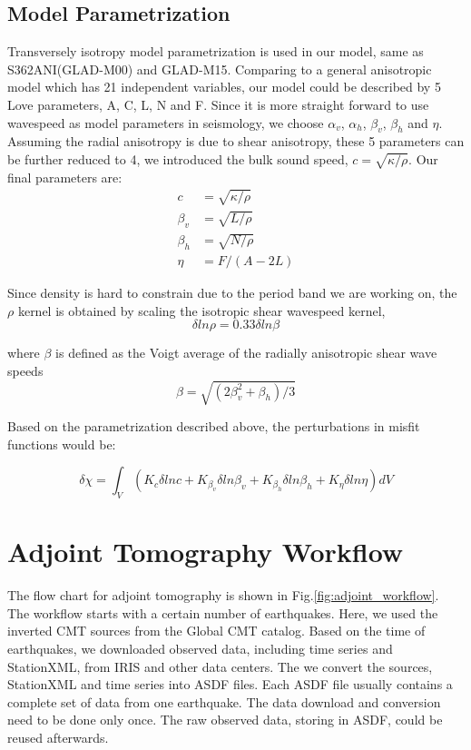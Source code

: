 \documentclass[extra,mreferee]{gji}
\begin{document}
\subsection{Model Parametrization}
Transversely isotropy model parametrization is used in our model, same as S362ANI(GLAD-M00)
and GLAD-M15. Comparing to a general anisotropic model which has 21 independent variables,
our model could be described by 5 Love parameters, A, C, L, N and F\citep{love2013treatise}.
Since it is more straight forward to use  wavespeed as model parameters in seismology,
we choose $\alpha_v$, $\alpha_h$, $\beta_v$, $\beta_h$ and $\eta$.
Assuming the radial anisotropy is due to shear anisotropy, these 5 parameters
can be further reduced to 4, we introduced the bulk sound speed,
$c=\sqrt{\kappa/\rho}$. Our final parameters are:\\
\begin{align*}
      c &= \sqrt{\kappa/\rho} \\
\beta_v &= \sqrt{L/\rho} \\
\beta_h &= \sqrt{N/\rho} \\
\eta & = F/(A-2L)
\end{align*}

Since density is hard to constrain due to the period band we are working on, the $\rho$ kernel is obtained by scaling the isotropic shear wavespeed kernel\citep{montagner1989petrological},\\
\begin{equation*}
    \delta ln\rho = 0.33\delta ln\beta
\end{equation*}

where $\beta$ is defined as the Voigt average of the radially anisotropic shear wave speeds\citep{babuska1991seismic}
$$\beta = \sqrt{(2\beta_v^2 + \beta_h)/3}$$

Based on the parametrization described above, the perturbations in misfit functions would be:

\begin{equation*}
    \delta \chi = \int_V
      (K_c\delta lnc + K_{\beta_v}\delta ln\beta_v + K_{\beta_h}\delta ln\beta_h +
      K_\eta \delta ln\eta) dV
\end{equation*}

\section{Adjoint Tomography Workflow}

The flow chart for adjoint tomography is shown in Fig.\ref{fig:adjoint_workflow}.
The workflow starts with a certain number of earthquakes. Here, we used the
inverted CMT sources from the Global CMT catalog. Based on the time
of earthquakes, we downloaded observed data, including time series and StationXML,
from IRIS and other data centers. The we convert the sources, StationXML and time series
into ASDF files. Each ASDF file usually contains a complete set of data from one
earthquake. The data download and conversion need to be done only once. The raw observed data,
storing in ASDF, could be reused afterwards.
\end{document}
